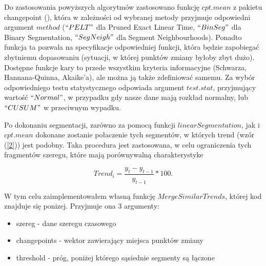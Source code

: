 \documentclass[polish, twoside, 12pt, a4paper]{article}
\theoremstyle{definition}
\theoremstyle{plain}
\theoremstyle{remark}
\begin{document}
Do zastosowania powyższych algorytmów zastosowano funkcję \(cpt.mean\) z pakietu changepoint (\cite{changepoint}), która w zależności od wybranej metody przyjmuje odpowiedni argument \(method\) (\(``PELT"\) dla Pruned Exact Linear Time, \(``BinSeg"\) dla Binary Segmentation, \(``SegNeigh"\) dla Segment Neighbourhoods). Ponadto funkcja ta pozwala na specyfikacje odpowiedniej funkcji, która będzie zapobiegać zbytniemu dopasowaniu (sytuacji, w której punktów zmiany byłoby zbyt dużo). Dostępne funkcje kary to przede wszystkim kryteria informacyjne (Schwarza, Hannana-Quinna, Akaike'a), ale można ją także zdefiniować samemu. Za wybór odpowiedniego testu statystycznego odpowiada argument \(test.stat\), przyjmujący wartość \(``Normal"\), w przypadku gdy nasze dane mają rozkład normalny, lub \(``CUSUM"\) w przeciwnym wypadku.

Po dokonaniu segmentacji, zarówno za pomocą funkcji \(linearSegmentation\), jak i \(cpt.mean\) dokonane zostanie połaczenie tych segmentów, w których trend (wzór (\ref{2})) jest podobny. Taka procedura jest zastosowana, w celu ograniczenia tych fragmentów szeregu, które mają porównywalną charakterystyke

\begin{equation}\label{2}
Trend_{i}=\frac{y_{t}-y_{t-1}}{y_{t-1 }}*100.
\end{equation}

W tym celu zaimplementowałem własną funkcję \(MergeSimilarTrends\), której kod znajduje się ponizej. Przyjmuje ona 3 argumenty:
\begin{itemize}
  \item szereg - dane szeregu czasowego 
  \item changepoints - wektor zawierający miejsca punktów zmiany
  \item threshold - próg, poniżej którego sąsiednie segmenty są łączone
\end{itemize}
\end{document}
